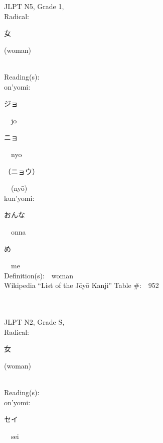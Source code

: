 \begin{multicols}{2}
{JLPT N5, Grade 1, \\Radical:\ \ {\begin{CJK}{UTF8}{min} 女 \end{CJK}} (woman) } \\
Reading(s):\ \ \\
{\hspace*{1em}}on'yomi:\ \ \\
{\hspace*{2em}}{\begin{CJK}{UTF8}{min} ジョ \end{CJK}}\ \ jo\ \ \\
{\hspace*{2em}}{\begin{CJK}{UTF8}{min} ニョ \end{CJK}}\ \ nyo\ \ \\
{\hspace*{2em}}{\begin{CJK}{UTF8}{min} （ニョウ） \end{CJK}}\ \ (ny\=o)\ \ \\
{\hspace*{1em}}kun'yomi:\ \ \\
{\hspace*{2em}}{\begin{CJK}{UTF8}{min} おんな \end{CJK}}\ \ onna\ \ \\
{\hspace*{2em}}{\begin{CJK}{UTF8}{min} め \end{CJK}}\ \ me\ \ \\
Definition(s):\ \ woman \\
Wikipedia ``List of the J\=oy\=o Kanji'' Table \#:\ \ 952 \\
\ \ \\
{\fontsize{34pt}{40pt}  }\ \ \\  %
{JLPT N2, Grade S, \\Radical:\ \ {\begin{CJK}{UTF8}{min} 女 \end{CJK}} (woman) } \\
Reading(s):\ \ \\
{\hspace*{1em}}on'yomi:\ \ \\
{\hspace*{2em}}{\begin{CJK}{UTF8}{min} セイ \end{CJK}}\ \ sei\ \ \\

\end{multicols}
